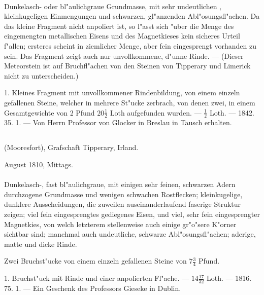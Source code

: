 \documentclass[a4paper, 11pt, oneside, polutonikogreek, german]{article}
\begin{document}
\paragraph{}
Dunkelasch- oder bl"aulichgraue Grundmasse, mit sehr undeutlichen , kleinkugeligen Einmengungen und schwarzen, gl"anzenden Abl"osungsfl"achen. Da das kleine Fragment nicht anpoliert ist, so l"asst sich "uber die Menge des eingemengten metallischen Eisens und des Magnetkieses kein sicheres Urteil f"allen; ersteres scheint in ziemlicher Menge, aber fein eingesprengt vorhanden zu sein. Das Fragment zeigt auch nur unvollkommene, d"unne Rinde. --- (Dieser Meteorstein ist auf Bruchfl"achen von den Steinen von Tipperary und Limerick nicht zu unterscheiden.)

1. Kleines Fragment mit unvollkommener Rindenbildung, von einem einzeln gefallenen Steine, welcher in mehrere St"ucke zerbrach, von denen zwei, in einem Gesamtgewichte von 2 Pfund $\mathfrak{20\frac{1}{2}}$ Loth aufgefunden wurden. --- $\mathfrak{\frac{1}{2}}$ Loth. --- 1842. 35. 1. --- Von Herrn Professor von Glocker in Breslau in Tausch erhalten.
\subsection{}
\begin{center}

(Mooresfort), Grafschaft Tipperary, Irland.

August 1810, Mittags.
\end{center}
\paragraph{}
Dunkelasch-, fast bl"aulichgraue, mit einigen sehr feinen, schwarzen Adern durchzogene Grundmasse und wenigen schwachen Rostflecken; kleinkugelige, dunklere Ausscheidungen, die zuweilen auseinanderlaufend faserige Struktur zeigen; viel fein eingesprengtes gediegenes Eisen, und viel, sehr fein eingesprengter Magnetkies, von welch letzterem stellenweise auch einige gr"o"sere K"orner sichtbar sind; manchmal auch undeutliche, schwarze Abl"osungsfl"achen; aderige, matte und dicke Rinde.

Zwei Bruchst"ucke von einem einzeln gefallenen Steine von $\mathfrak{7\frac{3}{4}}$ Pfund.

1. Bruchst"uck mit Rinde und einer anpolierten Fl"ache. --- $\mathfrak{14\frac{17}{32}}$ Loth. --- 1816. 75. 1. --- Ein Geschenk des Professors Gieseke in Dublin.
\end{document}
